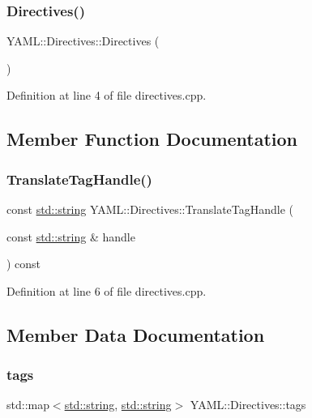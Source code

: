 \subsubsection{\texorpdfstring{Directives()}{Directives()}}
{\footnotesize\ttfamily Y\+A\+M\+L\+::\+Directives\+::\+Directives (\begin{DoxyParamCaption}{ }\end{DoxyParamCaption})}



Definition at line 4 of file directives.\+cpp.



\subsection{Member Function Documentation}
\mbox{\label{struct_y_a_m_l_1_1_directives_a75840e90c987368715c5cdf8703efc46}} 
\subsubsection{\texorpdfstring{TranslateTagHandle()}{TranslateTagHandle()}}
{\footnotesize\ttfamily const \mbox{\hyperlink{glad_8h_ac83513893df92266f79a515488701770}{std\+::string}} Y\+A\+M\+L\+::\+Directives\+::\+Translate\+Tag\+Handle (\begin{DoxyParamCaption}\item[{const \mbox{\hyperlink{glad_8h_ac83513893df92266f79a515488701770}{std\+::string}} \&}]{handle }\end{DoxyParamCaption}) const}



Definition at line 6 of file directives.\+cpp.



\subsection{Member Data Documentation}
\mbox{\label{struct_y_a_m_l_1_1_directives_a0dcffe42d032bc3e2f99a417811b6bde}} 
\subsubsection{\texorpdfstring{tags}{tags}}
{\footnotesize\ttfamily std\+::map$<$\mbox{\hyperlink{glad_8h_ac83513893df92266f79a515488701770}{std\+::string}}, \mbox{\hyperlink{glad_8h_ac83513893df92266f79a515488701770}{std\+::string}}$>$ Y\+A\+M\+L\+::\+Directives\+::tags}



